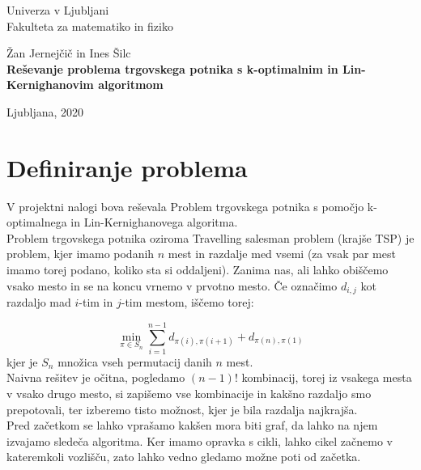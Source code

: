 \documentclass[12pt, a4paper]{article}
\begin{document}
\begin{titlepage}
\begin{center}

\large
Univerza v Ljubljani\\
\normalsize
Fakulteta za matematiko in fiziko\\

\vspace{3 cm} 

\large
Žan Jernejčič in Ines Šilc\\

\vspace{0.5cm}
\LARGE
\textbf{Reševanje problema trgovskega potnika s k-optimalnim in
Lin-Kernighanovim algoritmom}

\vfill

\large Ljubljana, 2020

\end{center}
\end{titlepage}

\newpage

\section[Definiranje problema]{Definiranje problema}

V projektni nalogi bova reševala Problem trgovskega potnika s pomočjo k-optimalnega in Lin-Kernighanovega algoritma.\\

Problem trgovskega potnika oziroma Travelling salesman problem (krajše TSP) je problem, kjer imamo podanih $n$ mest in razdalje med vsemi (za vsak par mest imamo torej podano, koliko sta si oddaljeni). Zanima nas, ali lahko obiščemo vsako mesto in se na koncu vrnemo v prvotno mesto. Če označimo $d_{i, j}$ kot razdaljo mad $i$-tim in $j$-tim mestom, iščemo torej:

$$
\min_{\pi \in S_n} \sum\limits_{i=1}^{n-1} d_{\pi (i), \pi (i+1)} + d_{\pi (n), \pi (1)}
$$
 kjer je $S_n$ množica vseh permutacij danih $n$ mest. \\
 
Naivna rešitev je očitna, pogledamo $(n-1)!$ kombinacij, torej iz vsakega mesta v vsako drugo mesto, si zapišemo vse kombinacije in kakšno razdaljo smo prepotovali, ter izberemo tisto možnost, kjer je bila razdalja najkrajša.\\ 

Pred začetkom se lahko vprašamo kakšen mora biti graf, da lahko na njem izvajamo sledeča algoritma. Ker imamo opravka s cikli, lahko cikel začnemo v kateremkoli vozlišču, zato lahko vedno gledamo možne poti od začetka.\\
\end{document}
